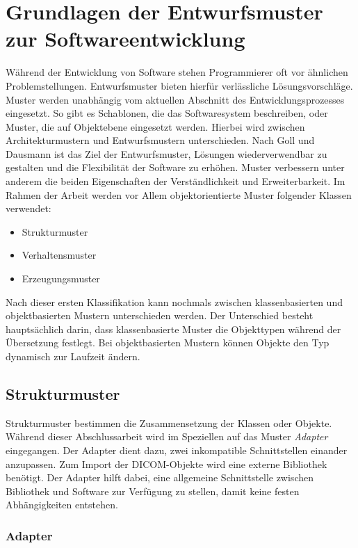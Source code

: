 \chapter{Grundlagen der Entwurfsmuster zur Softwareentwicklung}

Während der Entwicklung von Software stehen Programmierer oft vor ähnlichen Problemstellungen. Entwurfsmuster bieten hierfür verlässliche Lösungsvorschläge\cite{goll:swa}. Muster werden unabhängig vom aktuellen Abschnitt des Entwicklungsprozesses eingesetzt. So gibt es Schablonen, die das Softwaresystem beschreiben, oder Muster, die auf Objektebene eingesetzt werden. Hierbei wird zwischen Architekturmustern und Entwurfsmustern unterschieden. Nach Goll und Dausmann \cite[3.1, 3.2]{goll:swa} ist das Ziel der Entwurfsmuster, Lösungen wiederverwendbar zu gestalten und die Flexibilität der Software zu erhöhen. Muster verbessern unter anderem die beiden Eigenschaften der Verständlichkeit und Erweiterbarkeit. Im Rahmen der Arbeit werden vor Allem objektorientierte Muster folgender Klassen verwendet:

\begin{itemize}
\item Strukturmuster
\item Verhaltensmuster
\item Erzeugungsmuster
\end{itemize}

Nach dieser ersten Klassifikation kann nochmals zwischen klassenbasierten und objektbasierten Mustern unterschieden werden. Der Unterschied besteht hauptsächlich darin, dass klassenbasierte Muster die Objekttypen während der Übersetzung festlegt. Bei objektbasierten Mustern können Objekte den  Typ dynamisch zur Laufzeit ändern\cite[4.1]{goll:swa}.

\section{Strukturmuster}
Strukturmuster bestimmen die Zusammensetzung der Klassen oder Objekte. Während dieser Abschlussarbeit wird im Speziellen auf das Muster \textit{Adapter} eingegangen. Der Adapter dient dazu, zwei inkompatible Schnittstellen einander anzupassen. Zum Import der DICOM-Objekte wird eine externe Bibliothek benötigt. Der Adapter hilft dabei, eine allgemeine Schnittstelle zwischen Bibliothek und Software zur Verfügung zu stellen, damit keine festen Abhängigkeiten entstehen.

\subsection{Adapter}

